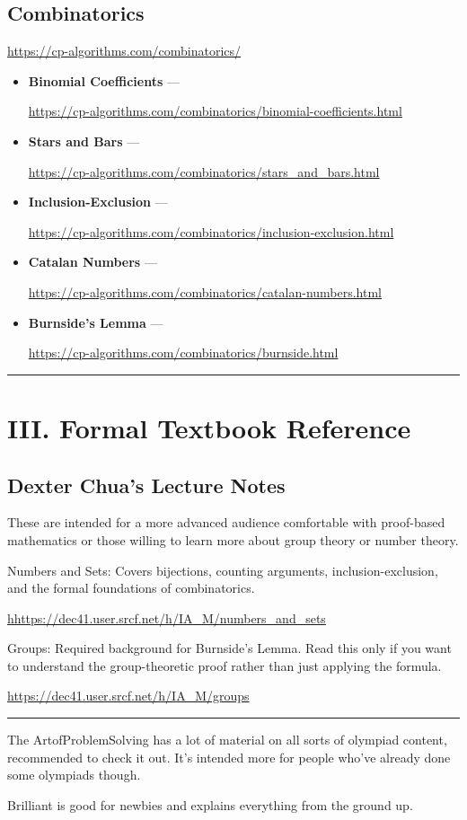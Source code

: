 \documentclass[11pt]{article}
\begin{document}
\subsection*{Combinatorics}
\url{https://cp-algorithms.com/combinatorics/}
\vspace{0.5em}
\begin{itemize}
    \item \textbf{Binomial Coefficients} ---
    
        \url{https://cp-algorithms.com/combinatorics/binomial-coefficients.html}
    \item \textbf{Stars and Bars} ---
    
        \url{https://cp-algorithms.com/combinatorics/stars_and_bars.html}
    \item \textbf{Inclusion-Exclusion} ---
    
        \url{https://cp-algorithms.com/combinatorics/inclusion-exclusion.html}
    \item \textbf{Catalan Numbers} ---
    
        \url{https://cp-algorithms.com/combinatorics/catalan-numbers.html}
    \item \textbf{Burnside's Lemma} ---
    
        \url{https://cp-algorithms.com/combinatorics/burnside.html}
\end{itemize}

\vspace{1em}
\hrule
\vspace{1em}

\section*{III. Formal Textbook Reference}

\subsection*{Dexter Chua's Lecture Notes}
These are intended for a more advanced audience comfortable with proof-based mathematics or those willing to learn more about group theory or number theory.

Numbers and Sets:
Covers bijections, counting arguments, inclusion-exclusion, and
the formal foundations of combinatorics.

\url{hhttps://dec41.user.srcf.net/h/IA_M/numbers_and_sets}

Groups:
Required background for Burnside's Lemma. Read this only if you want
to understand the group-theoretic proof rather than just applying the formula.

\url{https://dec41.user.srcf.net/h/IA_M/groups}
\vspace{1em}

\hrule
\vspace{1em}

The ArtofProblemSolving has a lot of material on all sorts of olympiad content, recommended to check it out. It's intended more for people who've already done some olympiads though.

Brilliant is good for newbies and explains everything from the ground up.
\end{document}
